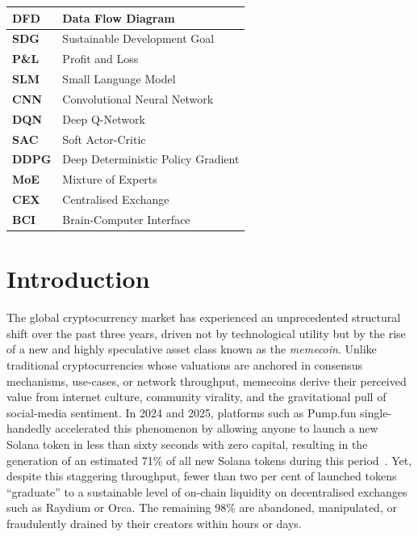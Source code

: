 \documentclass[12pt,a4paper,oneside,openany]{book}
\begin{document}
\begin{center}
\begin{tabular}{|>{\centering\arraybackslash}p{2.2cm}|>{\centering\arraybackslash}p{8.5cm}|}
\textbf{DFD}  & Data Flow Diagram \\ \hline
\textbf{SDG}  & Sustainable Development Goal \\ \hline
\textbf{P\&L} & Profit and Loss \\ \hline
\textbf{SLM}  & Small Language Model \\ \hline
\textbf{CNN}  & Convolutional Neural Network \\ \hline
\textbf{DQN}  & Deep Q-Network \\ \hline
\textbf{SAC}  & Soft Actor-Critic \\ \hline
\textbf{DDPG} & Deep Deterministic Policy Gradient \\ \hline
\textbf{MoE}  & Mixture of Experts \\ \hline
\textbf{CEX}  & Centralised Exchange \\ \hline
\textbf{BCI}  & Brain-Computer Interface \\ \hline
\end{tabular}
\end{center}

\mainmatter
\pagestyle{fancy}
\setcounter{page}{1}

\chapter{Introduction}
\label{ch:intro}

The global cryptocurrency market has experienced an unprecedented structural shift over the past three years, driven not by technological utility but by the rise of a new and highly speculative asset class known as the \emph{memecoin}. Unlike traditional cryptocurrencies whose valuations are anchored in consensus mechanisms, use-cases, or network throughput, memecoins derive their perceived value from internet culture, community virality, and the gravitational pull of social-media sentiment. In 2024 and 2025, platforms such as Pump.fun single-handedly accelerated this phenomenon by allowing anyone to launch a new Solana token in less than sixty seconds with zero capital, resulting in the generation of an estimated 71\% of all new Solana tokens during this period~\cite{ref10}. Yet, despite this staggering throughput, fewer than two per cent of launched tokens ``graduate'' to a sustainable level of on-chain liquidity on decentralised exchanges such as Raydium or Orca. The remaining 98\% are abandoned, manipulated, or fraudulently drained by their creators within hours or days.
\end{document}
